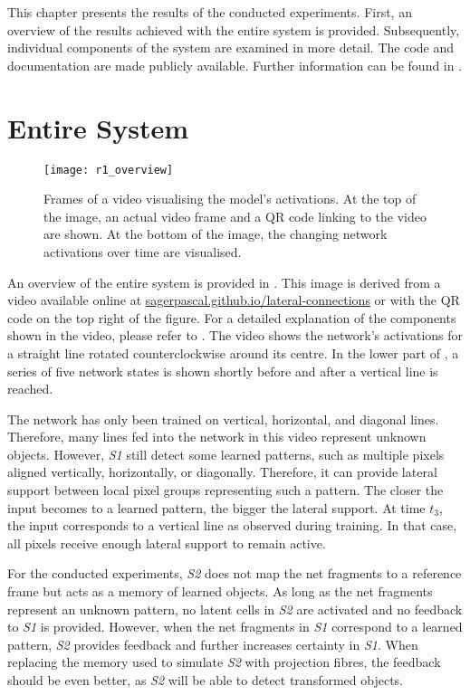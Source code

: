 This chapter presents the results of the conducted experiments. First, an overview of the results achieved with the entire system is provided. Subsequently, individual components of the system are examined in more detail.
The code and documentation are made publicly available. Further information can be found in .

\section{Entire System}
%
\begin{figure}[h]
    \centering
    \texttt{[image: r1\_overview]}
    \caption[Frames of a video visualising the model's activations]{Frames of a video visualising the model's activations. At the top of the image, an actual video frame and a QR code linking to the video are shown. At the bottom of the image, the changing network activations over time are visualised.}
\end{figure}
%
An overview of the entire system is provided in .
This image is derived from a video available online at \href{https://sagerpascal.github.io/lateral-connections/results/final_results.html#video-visualisations}{sagerpascal.github.io/lateral-connections} or with the QR code on the top right of the figure.
For a detailed explanation of the components shown in the video, please refer to .
The video shows the network's activations for a straight line rotated counterclockwise around its centre.
In the lower part of , a series of five network states is shown shortly before and after a vertical line is reached.

The network has only been trained on vertical, horizontal, and diagonal lines.
Therefore, many lines fed into the network in this video represent unknown objects.
However, \emph{S1} still detect some learned patterns, such as multiple pixels aligned vertically, horizontally, or diagonally.
Therefore, it can provide lateral support between local pixel groups representing such a pattern.
The closer the input becomes to a learned pattern, the bigger the lateral support.
At time $t_3$, the input corresponds to a vertical line as observed during training.
In that case, all pixels receive enough lateral support to remain active.

For the conducted experiments, \emph{S2} does not map the net fragments to a reference frame but acts as a memory of learned objects.
As long as the net fragments represent an unknown pattern, no latent cells in \emph{S2} are activated and no feedback to \emph{S1} is provided.
However, when the net fragments in \emph{S1} correspond to a learned pattern, \emph{S2} provides feedback and further increases certainty in \emph{S1}.
When replacing the memory used to simulate \emph{S2} with projection fibres, the feedback should be even better, as \emph{S2} will be able to detect transformed objects.


